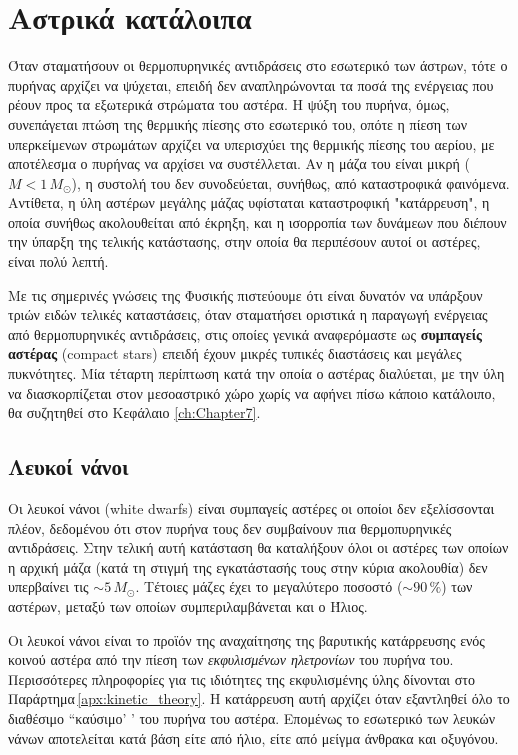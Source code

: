 \chapter{Αστρικά κατάλοιπα}
\label{ch:Chapter6}
{\hypersetup{linkcolor=black, pdfborder=0 0 1}
	\minitoc
}

Όταν σταματήσουν οι θερμοπυρηνικές αντιδράσεις στο εσωτερικό των άστρων, τότε ο πυρήνας αρχίζει να ψύχεται, επειδή δεν αναπληρώνονται τα ποσά της ενέργειας που ρέουν προς τα εξωτερικά στρώματα του αστέρα. Η ψύξη του πυρήνα, όμως, συνεπάγεται πτώση της θερμικής πίεσης στο εσωτερικό του, οπότε η πίεση των υπερκείμενων στρωμάτων αρχίζει να υπερισχύει της θερμικής πίεσης του αερίου, με αποτέλεσμα ο πυρήνας να αρχίσει να συστέλλεται. Αν η μάζα του είναι μικρή ($M < 1\,M_\odot$), η συστολή του δεν συνοδεύεται, συνήθως, από καταστροφικά φαινόμενα. Αντίθετα, η ύλη αστέρων μεγάλης μάζας υφίσταται καταστροφική "κατάρρευση", η οποία συνήθως ακολουθείται από έκρηξη, και η ισορροπία των δυνάμεων που διέπουν την ύπαρξη της τελικής κατάστασης, στην οποία θα περιπέσουν αυτοί οι αστέρες, είναι πολύ λεπτή.

Με τις σημερινές γνώσεις της Φυσικής πιστεύουμε ότι είναι δυνατόν να υπάρξουν τριών ειδών τελικές καταστάσεις, όταν σταματήσει οριστικά η παραγωγή ενέργειας από θερμοπυρηνικές αντιδράσεις, στις οποίες γενικά αναφερόμαστε ως \textbf{συμπαγείς αστέρας} (compact stars) επειδή έχουν μικρές τυπικές διαστάσεις και μεγάλες πυκνότητες. Μία τέταρτη περίπτωση κατά την οποία ο αστέρας διαλύεται, με την ύλη να διασκορπίζεται στον μεσοαστρικό χώρο χωρίς να αφήνει πίσω κάποιο κατάλοιπο, θα συζητηθεί στο Κεφάλαιο \ref{ch:Chapter7}.


\section{Λευκοί νάνοι}
 Οι λευκοί νάνοι (white dwarfs) είναι συμπαγείς αστέρες οι οποίοι δεν εξελίσσονται πλέον, δεδομένου ότι στον πυρήνα τους δεν συμβαίνουν πια θερμοπυρηνικές αντιδράσεις. Στην τελική αυτή κατάσταση θα καταλήξουν όλοι οι αστέρες των οποίων η αρχική μάζα (κατά τη στιγμή της εγκατάστασής τους στην κύρια ακολουθία) δεν υπερβαίνει τις $\sim 5\,M_\odot$. Τέτοιες μάζες έχει το μεγαλύτερο ποσοστό ($\sim 90\,\%$) των αστέρων, μεταξύ των οποίων συμπεριλαμβάνεται και ο Ήλιος.
 
 Οι λευκοί νάνοι είναι το προϊόν της αναχαίτησης της βαρυτικής κατάρρευσης ενός κοινού αστέρα από την πίεση των \textit{εκφυλισμένων ηλετρονίων} του πυρήνα του. Περισσότερες πληροφορίες για τις ιδιότητες της εκφυλισμένης ύλης δίνονται στο Παράρτημα\,\ref{apx:kinetic_theory}. Η κατάρρευση αυτή αρχίζει όταν εξαντληθεί όλο το διαθέσιμο ``καύσιμο' ' του πυρήνα του αστέρα. Επομένως το εσωτερικό των λευκών νάνων αποτελείται κατά βάση είτε από ήλιο, είτε από μείγμα άνθρακα και οξυγόνου.
 
